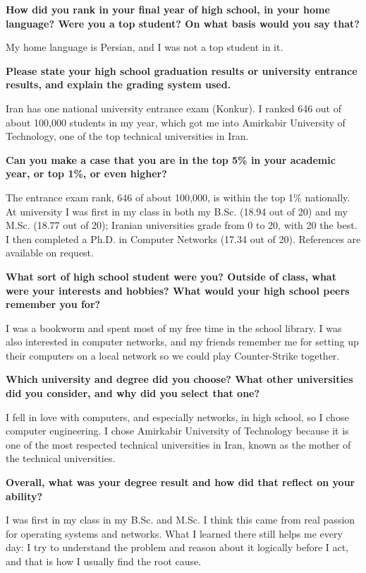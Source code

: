 \noindent
\textbf{How did you rank in your final year of high school, in your home language? Were you a top student? On what basis would you say that?}

My home language is Persian, and I was not a top student in it.

\noindent
\textbf{Please state your high school graduation results or university entrance results, and explain the grading system used.}

Iran has one national university entrance exam (Konkur). I ranked 646 out of about 100,000 students in my year, which got me into Amirkabir University
of Technology, one of the top technical universities in Iran.

\noindent
\textbf{Can you make a case that you are in the top 5\% in your academic year, or top 1\%, or even higher?}

The entrance exam rank, 646 of about 100,000, is within the top 1\% nationally. At university I was first in my class in both my B.Sc. (18.94 out of 20)
and my M.Sc. (18.77 out of 20); Iranian universities grade from 0 to 20, with 20 the best. I then completed a Ph.D. in Computer Networks (17.34 out of 20).
References are available on request.

\noindent
\textbf{What sort of high school student were you? Outside of class, what were your interests and hobbies? What would your high school peers remember you for?}

I was a bookworm and spent most of my free time in the school library. I was also interested in computer networks, and my friends remember me for
setting up their computers on a local network so we could play Counter-Strike together.

\noindent
\textbf{Which university and degree did you choose? What other universities did you consider, and why did you select that one?}

I fell in love with computers, and especially networks, in high school, so I chose computer engineering. I chose Amirkabir University of Technology because
it is one of the most respected technical universities in Iran, known as the mother of the technical universities.

\noindent
\textbf{Overall, what was your degree result and how did that reflect on your ability?}

I was first in my class in my B.Sc. and M.Sc. I think this came from real passion for operating systems and networks. What I learned there still helps
me every day: I try to understand the problem and reason about it logically before I act, and that is how I usually find the root cause.

